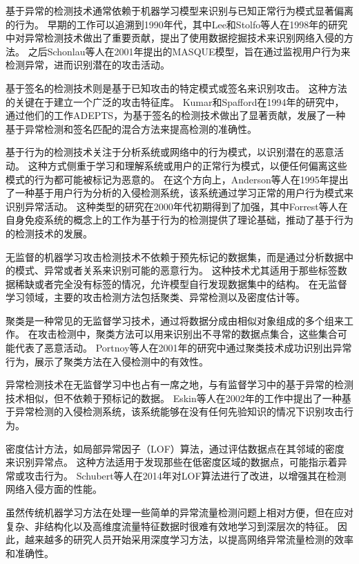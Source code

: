 基于异常的检测技术通常依赖于机器学习模型来识别与已知正常行为模式显著偏离的行为。
早期的工作可以追溯到1990年代，其中Lee和Stolfo等人\cite{lee1998dataMining}在1998年的研究中对异常检测技术做出了重要贡献，提出了使用数据挖掘技术来识别网络入侵的方法。
之后Schonlau等人在2001年提出的MASQUE模型，旨在通过监视用户行为来检测异常，进而识别潜在的攻击活动。

基于签名的检测技术则是基于已知攻击的特定模式或签名来识别攻击。
这种方法的关键在于建立一个广泛的攻击特征库。
Kumar和Spafford\cite{kumar1994adep}在1994年的研究中，通过他们的工作ADEPTS，为基于签名的检测技术做出了显著贡献，发展了一种基于异常检测和签名匹配的混合方法来提高检测的准确性。

基于行为的检测技术关注于分析系统或网络中的行为模式，以识别潜在的恶意活动。
这种方式侧重于学习和理解系统或用户的正常行为模式，以便任何偏离这些模式的行为都可能被标记为恶意的。
在这个方向上，Anderson等人\cite{anderson1995userBehavior}在1995年提出了一种基于用户行为分析的入侵检测系统，该系统通过学习正常的用户行为模式来识别异常活动。
这种类型的研究在2000年代初期得到了加强，其中Forrest等人\cite{forrest1996selfImmune}在自身免疫系统的概念上的工作为基于行为的检测提供了理论基础，推动了基于行为的检测技术的发展。



无监督的机器学习攻击检测技术不依赖于预先标记的数据集，而是通过分析数据中的模式、异常或者关系来识别可能的恶意行为。
这种技术尤其适用于那些标签数据稀缺或者完全没有标签的情况，允许模型自行发现数据集中的结构。
在无监督学习领域，主要的攻击检测方法包括聚类、异常检测以及密度估计等。

聚类是一种常见的无监督学习技术，通过将数据分成由相似对象组成的多个组来工作。
在攻击检测中，聚类方法可以用来识别出不寻常的数据点集合，这些集合可能代表了恶意活动。
Portnoy等人\cite{portnoy2001clustering}在2001年的研究中通过聚类技术成功识别出异常行为，展示了聚类方法在入侵检测中的有效性。

异常检测技术在无监督学习中也占有一席之地，与有监督学习中的基于异常的检测技术相似，但不依赖于预标记的数据。
Eskin等人\cite{eskin2002anomaly}在2002年的工作中提出了一种基于异常检测的入侵检测系统，该系统能够在没有任何先验知识的情况下识别攻击行为。

密度估计方法，如局部异常因子（LOF）算法，通过评估数据点在其邻域的密度来识别异常点。
这种方法适用于发现那些在低密度区域的数据点，可能指示着异常或攻击行为。
Schubert等人\cite{schubert2014local}在2014年对LOF算法进行了改进，以增强其在检测网络入侵方面的性能。

虽然传统机器学习方法在处理一些简单的异常流量检测问题上相对方便，但在应对复杂、非结构化以及高维度流量特征数据时很难有效地学习到深层次的特征。
因此，越来越多的研究人员开始采用深度学习方法，以提高网络异常流量检测的效率和准确性。\par

